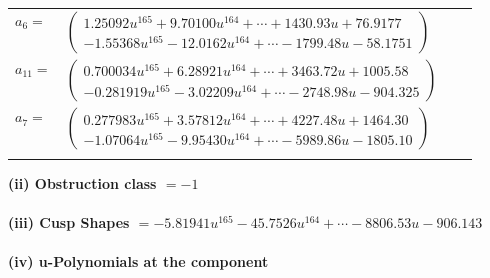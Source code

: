 \documentclass[1p]{elsarticle_modified}
\theoremstyle{definition}
\begin{document}
\begin{tabular}{m{7pt} m{180pt} m{7pt} m{180pt} }
\flushright $a_{6}=$&$\begin{pmatrix}1.25092 u^{165}+9.70100 u^{164}+\cdots+1430.93 u+76.9177\\-1.55368 u^{165}-12.0162 u^{164}+\cdots-1799.48 u-58.1751\end{pmatrix}$ \\
\flushright $a_{11}=$&$\begin{pmatrix}0.700034 u^{165}+6.28921 u^{164}+\cdots+3463.72 u+1005.58\\-0.281919 u^{165}-3.02209 u^{164}+\cdots-2748.98 u-904.325\end{pmatrix}$ \\
\flushright $a_{7}=$&$\begin{pmatrix}0.277983 u^{165}+3.57812 u^{164}+\cdots+4227.48 u+1464.30\\-1.07064 u^{165}-9.95430 u^{164}+\cdots-5989.86 u-1805.10\end{pmatrix}$\\&\end{tabular}
\flushleft \textbf{(ii) Obstruction class $= -1$}\\~\\
\flushleft \textbf{(iii) Cusp Shapes $= -5.81941 u^{165}-45.7526 u^{164}+\cdots-8806.53 u-906.143$}\\~\\
\newpage\renewcommand{\arraystretch}{1}
\flushleft \textbf{(iv) u-Polynomials at the component}\newline \\
\end{document}
